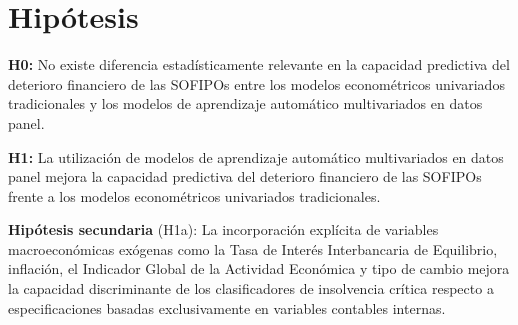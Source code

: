 \section{Hipótesis}
\textbf{H0:} No existe diferencia estadísticamente relevante en la capacidad predictiva del deterioro financiero de las SOFIPOs entre los modelos econométricos univariados tradicionales y los modelos de aprendizaje automático multivariados en datos panel.

\textbf{H1:} La utilización de modelos de aprendizaje automático multivariados en datos panel mejora la capacidad predictiva del deterioro financiero de las SOFIPOs frente a los modelos econométricos univariados tradicionales.

\textbf{Hipótesis secundaria} (H1a): La incorporación explícita de variables macroeconómicas exógenas como la Tasa de Interés Interbancaria de Equilibrio, inflación, el Indicador Global de la Actividad Económica y tipo de cambio mejora la capacidad discriminante de los clasificadores de insolvencia crítica respecto a especificaciones basadas exclusivamente en variables contables internas.

